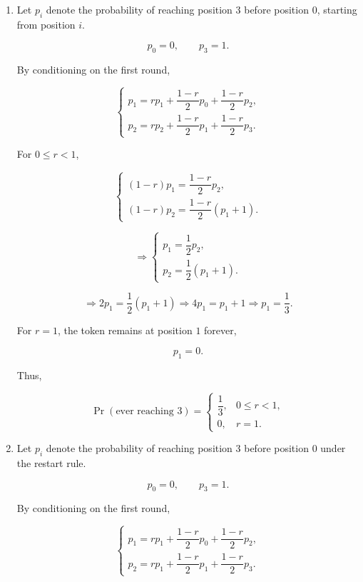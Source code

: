 \documentclass[11pt,a4paper]{article}
\begin{document}
\begin{enumerate}

\item[(a)]

Let $p_i$ denote the probability of reaching position $3$
before position $0$, starting from position $i$.

\[
p_0=0,\qquad p_3=1.
\]

By conditioning on the first round,

\[
\begin{cases}
p_1=rp_1+\dfrac{1-r}{2}p_0
          +\dfrac{1-r}{2}p_2,\\[8pt]
p_2=rp_2+\dfrac{1-r}{2}p_1
          +\dfrac{1-r}{2}p_3.
\end{cases}
\]

For $0\le r<1$,

\[
\begin{cases}
(1-r)p_1=\dfrac{1-r}{2}p_2,\\[8pt]
(1-r)p_2=\dfrac{1-r}{2}(p_1+1).
\end{cases}
\]

\[
\Rightarrow
\begin{cases}
p_1=\dfrac12p_2,\\[6pt]
p_2=\dfrac12(p_1+1).
\end{cases}
\]

\[
\Rightarrow
2p_1=\frac12(p_1+1)
\Rightarrow 4p_1=p_1+1
\Rightarrow p_1=\frac13.
\]

For $r=1$, the token remains at position $1$ forever,

\[
p_1=0.
\]

Thus,

\[
\Pr(\text{ever reaching }3)=
\begin{cases}
\dfrac13, & 0\le r<1,\\[6pt]
0, & r=1.
\end{cases}
\]

\item[(b)]

Let $p_i$ denote the probability of reaching position $3$
before position $0$ under the restart rule.

\[
p_0=0,\qquad p_3=1.
\]

By conditioning on the first round,

\[
\begin{cases}
p_1=rp_1+\dfrac{1-r}{2}p_0
          +\dfrac{1-r}{2}p_2,\\[8pt]
p_2=rp_1+\dfrac{1-r}{2}p_1
          +\dfrac{1-r}{2}p_3.
\end{cases}
\]


\end{enumerate}
\end{document}
